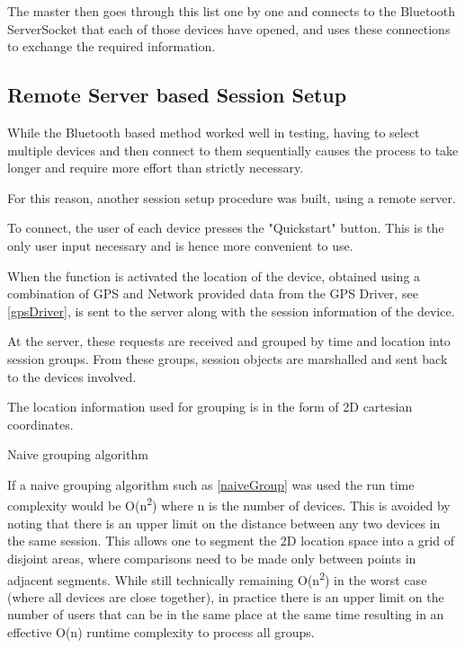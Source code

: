 The master then goes through this list one by one and connects to the Bluetooth ServerSocket that each of those devices have opened, and uses these connections to exchange the required information.

\subsection{Remote Server based Session Setup}

While the Bluetooth based method worked well in testing, having to select multiple devices and then connect to them sequentially causes the process to take longer and require more effort than strictly necessary.

For this reason, another session setup procedure was built, using a remote server.

To connect, the user of each device presses the "Quickstart" button. This is the only user input necessary and is hence more convenient to use.

When the function is activated the location of the device, obtained using a combination of GPS and Network provided data from the GPS Driver, see \ref{gpsDriver}, is sent to the server along with the session information of the device.

At the server, these requests are received and grouped by time and location into session groups. From these groups, session objects are marshalled and sent back to the devices involved.

The location information used for grouping is in the form of 2D cartesian coordinates.

\begin{algorithm}
\caption{Naive grouping algorithm}
\label{naiveGroup}
\end{algorithm}

If a naive grouping algorithm such as \ref{naiveGroup} was used the run time complexity would be O(n\textsuperscript{2}) where n is the number of devices.
This is avoided by noting that there is an upper limit on the distance between any two devices in the same session. This allows one to segment the 2D location space into a grid of disjoint areas, where comparisons need to be made only between points in adjacent segments. While still technically remaining O(n\textsuperscript{2}) in the worst case (where all devices are close together), in practice there is an upper limit on the number of users that can be in the same place at the same time resulting in an effective O(n) runtime complexity to process all groups.


